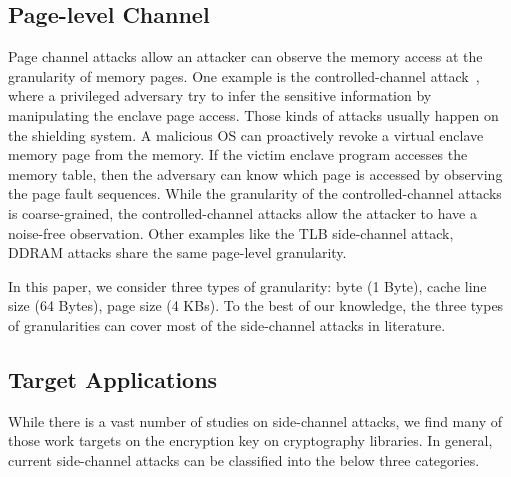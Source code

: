 \subsection{Page-level Channel}
Page channel attacks allow an attacker can observe the memory access at the granularity of memory pages. One example is the controlled-channel attack~\cite{xu2015controlled}, where a privileged adversary try to infer the sensitive information by manipulating the enclave page access. Those kinds of attacks usually happen on the shielding system. A malicious OS can proactively revoke a virtual enclave memory page from the memory. If the victim enclave program accesses the memory table, then the adversary can know which page is accessed by observing the page fault sequences. While the granularity of the controlled-channel attacks is coarse-grained, the controlled-channel attacks allow the attacker to have a noise-free observation. Other examples like the TLB side-channel attack, DDRAM attacks share the same page-level granularity.


In this paper, we consider three types of granularity: byte (1 Byte), cache line size (64 Bytes), page size (4 KBs). To the best of our knowledge, the three types of granularities can cover most of the side-channel attacks in literature.

\subsection{Target Applications}
While there is a vast number of studies\cite{yarom2017cachebleed,191010,184415,Osvik2006,liu2015last} on side-channel attacks, we find many of those work targets on the encryption key on cryptography libraries. In general, current side-channel attacks can be classified into the below three categories.

